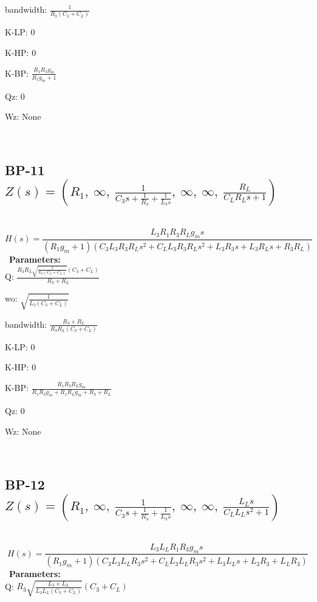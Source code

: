 \documentclass{article}
\begin{document}
bandwidth: $\frac{1}{R_{3} \left(C_{3} + C_{L}\right)}$\ 

K-LP: $0$\ 

K-HP: $0$\ 

K-BP: $\frac{R_{1} R_{3} g_{m}}{R_{1} g_{m} + 1}$\ 

Qz: $0$\ 

Wz: $\text{None}$\ 

\ 

\subsection{BP-11 $Z(s) = \left( R_{1}, \  \infty, \  \frac{1}{C_{3} s + \frac{1}{R_{3}} + \frac{1}{L_{3} s}}, \  \infty, \  \infty, \  \frac{R_{L}}{C_{L} R_{L} s + 1}\right)$ } \ 
\textbf{\[H(s) = \frac{L_{3} R_{1} R_{3} R_{L} g_{m} s}{\left(R_{1} g_{m} + 1\right) \left(C_{3} L_{3} R_{3} R_{L} s^{2} + C_{L} L_{3} R_{3} R_{L} s^{2} + L_{3} R_{3} s + L_{3} R_{L} s + R_{3} R_{L}\right)}\] } \ 
\textbf{Parameters:}\\ 

Q: $\frac{R_{3} R_{L} \sqrt{\frac{1}{L_{3} \left(C_{3} + C_{L}\right)}} \left(C_{3} + C_{L}\right)}{R_{3} + R_{L}}$\ 

wo: $\sqrt{\frac{1}{L_{3} \left(C_{3} + C_{L}\right)}}$\ 

bandwidth: $\frac{R_{3} + R_{L}}{R_{3} R_{L} \left(C_{3} + C_{L}\right)}$\ 

K-LP: $0$\ 

K-HP: $0$\ 

K-BP: $\frac{R_{1} R_{3} R_{L} g_{m}}{R_{1} R_{3} g_{m} + R_{1} R_{L} g_{m} + R_{3} + R_{L}}$\ 

Qz: $0$\ 

Wz: $\text{None}$\ 

\ 

\subsection{BP-12 $Z(s) = \left( R_{1}, \  \infty, \  \frac{1}{C_{3} s + \frac{1}{R_{3}} + \frac{1}{L_{3} s}}, \  \infty, \  \infty, \  \frac{L_{L} s}{C_{L} L_{L} s^{2} + 1}\right)$ } \ 
\textbf{\[H(s) = \frac{L_{3} L_{L} R_{1} R_{3} g_{m} s}{\left(R_{1} g_{m} + 1\right) \left(C_{3} L_{3} L_{L} R_{3} s^{2} + C_{L} L_{3} L_{L} R_{3} s^{2} + L_{3} L_{L} s + L_{3} R_{3} + L_{L} R_{3}\right)}\] } \ 
\textbf{Parameters:}\\ 

Q: $R_{3} \sqrt{\frac{L_{3} + L_{L}}{L_{3} L_{L} \left(C_{3} + C_{L}\right)}} \left(C_{3} + C_{L}\right)$\ 
\end{document}

